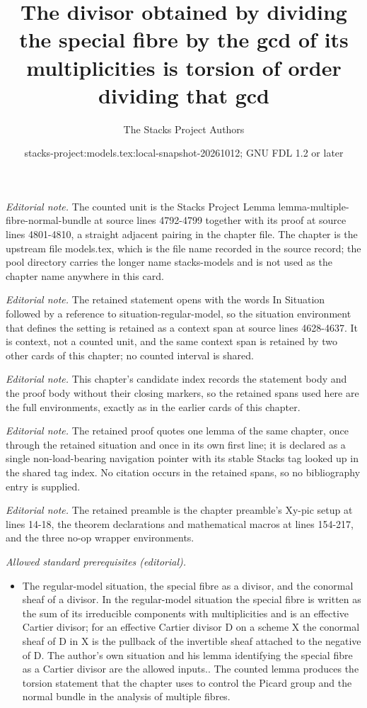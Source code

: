 \documentclass[10pt,a4paper]{amsart}
\title{The divisor obtained by dividing the special fibre by the gcd of its multiplicities is torsion of order dividing that gcd}
\author{The Stacks Project Authors}
\date{stacks-project:models.tex:local-snapshot-20261012; GNU FDL 1.2 or later}
\theoremstyle{plain}
\theoremstyle{definition}
\theoremstyle{remark}
\numberwithin{equation}{subsection}
\begin{document}
\maketitle
\noindent\textit{Editorial note.} The counted unit is the Stacks Project Lemma lemma-multiple-fibre-normal-bundle at source lines 4792-4799 together with its proof at source lines 4801-4810, a straight adjacent pairing in the chapter file. The chapter is the upstream file models.tex, which is the file name recorded in the source record; the pool directory carries the longer name stacks-models and is not used as the chapter name anywhere in this card.\par\medskip
\noindent\textit{Editorial note.} The retained statement opens with the words In Situation followed by a reference to situation-regular-model, so the situation environment that defines the setting is retained as a context span at source lines 4628-4637. It is context, not a counted unit, and the same context span is retained by two other cards of this chapter; no counted interval is shared.\par\medskip
\noindent\textit{Editorial note.} This chapter's candidate index records the statement body and the proof body without their closing markers, so the retained spans used here are the full environments, exactly as in the earlier cards of this chapter.\par\medskip
\noindent\textit{Editorial note.} The retained proof quotes one lemma of the same chapter, once through the retained situation and once in its own first line; it is declared as a single non-load-bearing navigation pointer with its stable Stacks tag looked up in the shared tag index. No citation occurs in the retained spans, so no bibliography entry is supplied.\par\medskip
\noindent\textit{Editorial note.} The retained preamble is the chapter preamble's Xy-pic setup at lines 14-18, the theorem declarations and mathematical macros at lines 154-217, and the three no-op wrapper environments.\par\medskip
\noindent\textit{Allowed standard prerequisites (editorial).}\begin{itemize}
\item The regular-model situation, the special fibre as a divisor, and the conormal sheaf of a divisor. In the regular-model situation the special fibre is written as the sum of its irreducible components with multiplicities and is an effective Cartier divisor; for an effective Cartier divisor D on a scheme X the conormal sheaf of D in X is the pullback of the invertible sheaf attached to the negative of D. The author's own situation and his lemma identifying the special fibre as a Cartier divisor are the allowed inputs.. The counted lemma produces the torsion statement that the chapter uses to control the Picard group and the normal bundle in the analysis of multiple fibres.
\end{itemize}\medskip
\end{document}
